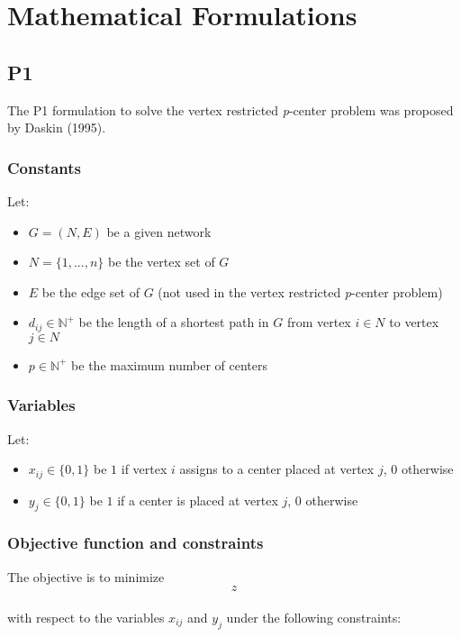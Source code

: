 \chapter{Mathematical Formulations}
\section{P1}
The P1 formulation to solve the vertex restricted \textit{p}-center problem was proposed by Daskin (1995).
\subsection{Constants}
Let:
\begin{itemize}
	\item $G = \left( N, E\right)$ be a given network
	\item $N = \lbrace 1, ..., n\rbrace$ be the vertex set of $G$
	\item $E$ be the edge set of $G$ (not used in the vertex restricted \textit{p}-center problem)
	\item $d_{ij} \in \mathbb{N}^+$ be the length of a shortest path in $G$ from vertex $i \in N$ to vertex $j \in N$
	\item $p \in \mathbb{N}^+$ be the maximum number of centers
\end{itemize}
\subsection{Variables}
Let:
\begin{itemize}
	\item $x_{ij} \in \lbrace 0, 1\rbrace$ be $1$ if vertex $i$ assigns to a center placed at vertex $j$, $0$ otherwise
	\item $y_{j} \in \lbrace 0, 1\rbrace$ be $1$ if a center is placed at vertex $j$, $0$ otherwise
\end{itemize}
\subsection{Objective function and constraints}
The objective is to minimize\\ $$z$$\\ with respect to the variables $x_{ij}$ and $y_{j}$ under the following constraints:\\

